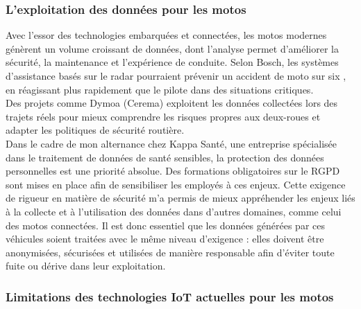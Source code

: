 \subsubsection{L'exploitation des données pour les motos}
Avec l’essor des technologies embarquées et connectées, les motos modernes génèrent un volume croissant de données, dont l’analyse permet d’améliorer la sécurité, la maintenance et l’expérience de conduite.
Selon Bosch, les systèmes d’assistance basés sur le radar pourraient prévenir un accident de moto sur six \cite{aras_bosh_site_off}, en réagissant plus rapidement que le pilote dans des situations critiques. \\
Des projets comme Dymoa (Cerema) exploitent les données collectées lors des trajets réels pour mieux comprendre les risques propres aux deux-roues et adapter les politiques de sécurité routière.\\
Dans le cadre de mon alternance chez Kappa Santé, une entreprise spécialisée dans le traitement de données de santé sensibles, la protection des données personnelles est une priorité absolue. Des formations obligatoires sur le RGPD sont mises en place afin de sensibiliser les employés à ces enjeux. Cette exigence de rigueur en matière de sécurité m’a permis de mieux appréhender les enjeux liés à la collecte et à l’utilisation des données dans d’autres domaines, comme celui des motos connectées. Il est donc essentiel que les données générées par ces véhicules soient traitées avec le même niveau d’exigence : elles doivent être anonymisées, sécurisées et utilisées de manière responsable afin d’éviter toute fuite ou dérive dans leur exploitation.



\subsubsection{Limitations des technologies IoT actuelles pour les motos}

